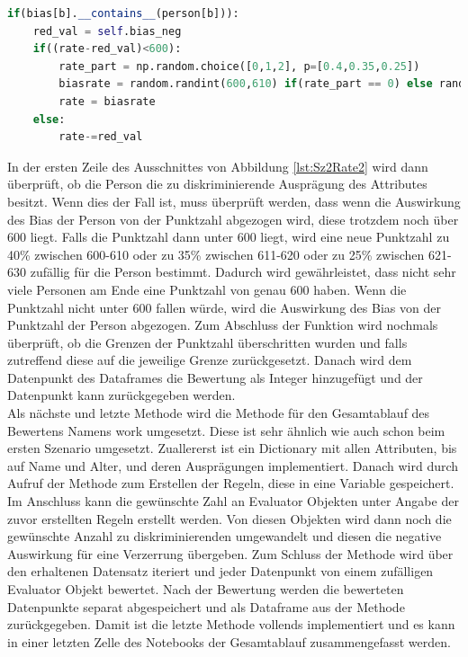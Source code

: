 \begin{onehalfspace}
\begin{lstlisting}[language=Python,label={lst:Sz2Rate2},caption=Codeausschnitt für das Hinzufügen einer Verzerrung beim Bewerten der Personen]
if(bias[b].__contains__(person[b])):
    red_val = self.bias_neg
    if((rate-red_val)<600):
        rate_part = np.random.choice([0,1,2], p=[0.4,0.35,0.25])
        biasrate = random.randint(600,610) if(rate_part == 0) else random.randint(611,620) if(rate_part == 1) else random.randint(621,630)
        rate = biasrate
    else:
        rate-=red_val
\end{lstlisting}
In der ersten Zeile des Ausschnittes von Abbildung \ref{lst:Sz2Rate2} wird dann überprüft, ob die Person die zu diskriminierende Ausprägung des Attributes besitzt. Wenn dies der Fall ist, muss überprüft werden, dass wenn die Auswirkung des Bias der Person von der Punktzahl abgezogen wird, diese trotzdem noch über 600 liegt. Falls die Punktzahl dann unter 600 liegt, wird eine neue Punktzahl zu 40\% zwischen 600-610 oder zu 35\% zwischen 611-620 oder zu 25\% zwischen 621-630 zufällig für die Person bestimmt. Dadurch wird gewährleistet, dass nicht sehr viele Personen am Ende eine Punktzahl von genau 600 haben. Wenn die Punktzahl nicht unter 600 fallen würde, wird die Auswirkung des Bias von der Punktzahl der Person abgezogen.
Zum Abschluss der Funktion wird nochmals überprüft, ob die Grenzen der Punktzahl überschritten wurden und falls zutreffend diese auf die jeweilige Grenze zurückgesetzt. Danach wird dem Datenpunkt des Dataframes die Bewertung als Integer hinzugefügt und der Datenpunkt kann zurückgegeben werden.\\
Als nächste und letzte Methode wird die Methode für den Gesamtablauf des Bewertens Namens \glqq{}work\grqq{} umgesetzt. Diese ist sehr ähnlich wie auch schon beim ersten Szenario umgesetzt. Zuallererst ist ein Dictionary mit allen Attributen, bis auf Name und Alter, und deren Ausprägungen implementiert. Danach wird durch Aufruf der Methode zum Erstellen der Regeln, diese in eine Variable gespeichert. Im Anschluss kann die gewünschte Zahl an \glqq{}Evaluator\grqq{} Objekten unter Angabe der zuvor erstellten Regeln erstellt werden. Von diesen Objekten wird dann noch die gewünschte Anzahl zu diskriminierenden umgewandelt und diesen die negative Auswirkung für eine Verzerrung übergeben. Zum Schluss der Methode wird über den erhaltenen Datensatz iteriert und jeder Datenpunkt von einem zufälligen \glqq{}Evaluator\grqq{} Objekt bewertet. Nach der Bewertung werden die bewerteten Datenpunkte separat abgespeichert und als Dataframe aus der Methode zurückgegeben. Damit ist die letzte Methode vollends implementiert und es kann in einer letzten Zelle des Notebooks der Gesamtablauf zusammengefasst werden.

\end{onehalfspace}
